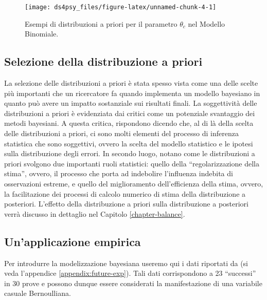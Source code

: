 \documentclass[
]{book}
\theoremstyle{definition}
\theoremstyle{definition}
\theoremstyle{definition}
\theoremstyle{definition}
\theoremstyle{remark}
\begin{document}
\begin{figure}

{\centering \texttt{[image: ds4psy\_files/figure-latex/unnamed-chunk-4-1]} 

}

\caption{Esempi di distribuzioni a priori per il parametro $\theta_c$ nel Modello Binomiale.}\label{fig:unnamed-chunk-4}
\end{figure}

\hypertarget{selezione-della-distribuzione-a-priori}{%
\subsection{Selezione della distribuzione a priori}\label{selezione-della-distribuzione-a-priori}}

La selezione delle distribuzioni a priori è stata spesso vista come una delle scelte più importanti che un ricercatore fa quando implementa un modello bayesiano in quanto può avere un impatto sostanziale sui risultati finali. La soggettività delle distribuzioni a priori è evidenziata dai critici come un potenziale svantaggio dei metodi bayesiani. A questa critica, \citet{vandeSchoot2021modelling} rispondono dicendo che, al di là della scelta delle distribuzioni a priori, ci sono molti elementi del processo di inferenza statistica che sono soggettivi, ovvero la scelta del modello statistico e le ipotesi sulla distribuzione degli errori. In secondo luogo, \citet{vandeSchoot2021modelling} notano come le distribuzioni a priori svolgono due importanti ruoli statistici: quello della ``regolarizzazione della stima'', ovvero, il processo che porta ad indebolire l'influenza indebita di osservazioni estreme, e quello del miglioramento dell'efficienza della stima, ovvero, la facilitazione dei processi di calcolo numerico di stima della distribuzione a posteriori. L'effetto della distribuzione a priori sulla distribuzione a posteriori verrà discusso in dettaglio nel Capitolo \ref{chapter-balance}.

\hypertarget{unapplicazione-empirica}{%
\subsection{Un'applicazione empirica}\label{unapplicazione-empirica}}

Per introdurre la modelizzazione bayesiana useremo qui i dati riportati da \citet{zetschefuture2019} (si veda l'appendice \ref{appendix:future-exp}). Tali dati corrispondono a 23 ``successi'' in 30 prove e possono dunque essere considerati la manifestazione di una variabile casuale Bernoulliana.
\end{document}

